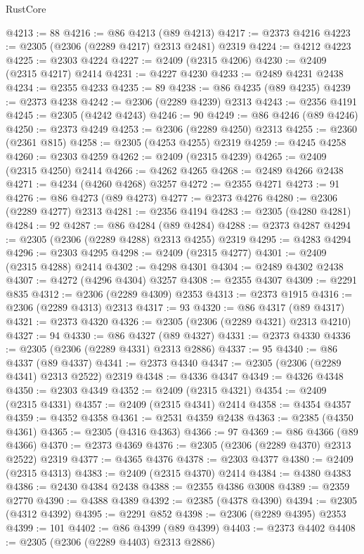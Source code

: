 \begin{lexlean}{RustCore}
\begin{coremodule}
@4213 := 88
@4216 := @86 @4213 (@89 @4213)
@4217 := @2373 @4216
@4223 := @2305 (@2306 (@2289 @4217) @2313 @2481) @2319
@4224 := @4212 @4223
@4225 := @2303 @4224
@4227 := @2409 (@2315 @4206)
@4230 := @2409 (@2315 @4217) @2414
@4231 := @4227 @4230
@4233 := @2489 @4231 @2438
@4234 := @2355 @4233
@4235 := 89
@4238 := @86 @4235 (@89 @4235)
@4239 := @2373 @4238
@4242 := @2306 (@2289 @4239) @2313
@4243 := @2356 @4191
@4245 := @2305 (@4242 @4243)
@4246 := 90
@4249 := @86 @4246 (@89 @4246)
@4250 := @2373 @4249
@4253 := @2306 (@2289 @4250) @2313
@4255 := @2360 (@2361 @815)
@4258 := @2305 (@4253 @4255) @2319
@4259 := @4245 @4258
@4260 := @2303 @4259
@4262 := @2409 (@2315 @4239)
@4265 := @2409 (@2315 @4250) @2414
@4266 := @4262 @4265
@4268 := @2489 @4266 @2438
@4271 := @4234 (@4260 @4268) @3257
@4272 := @2355 @4271
@4273 := 91
@4276 := @86 @4273 (@89 @4273)
@4277 := @2373 @4276
@4280 := @2306 (@2289 @4277) @2313
@4281 := @2356 @4194
@4283 := @2305 (@4280 @4281)
@4284 := 92
@4287 := @86 @4284 (@89 @4284)
@4288 := @2373 @4287
@4294 := @2305 (@2306 (@2289 @4288) @2313 @4255) @2319
@4295 := @4283 @4294
@4296 := @2303 @4295
@4298 := @2409 (@2315 @4277)
@4301 := @2409 (@2315 @4288) @2414
@4302 := @4298 @4301
@4304 := @2489 @4302 @2438
@4307 := @4272 (@4296 @4304) @3257
@4308 := @2355 @4307
@4309 := @2291 @835
@4312 := @2306 (@2289 @4309) @2353
@4313 := @2373 @1915
@4316 := @2306 (@2289 @4313) @2313
@4317 := 93
@4320 := @86 @4317 (@89 @4317)
@4321 := @2373 @4320
@4326 := @2305 (@2306 (@2289 @4321) @2313 @4210)
@4327 := 94
@4330 := @86 @4327 (@89 @4327)
@4331 := @2373 @4330
@4336 := @2305 (@2306 (@2289 @4331) @2313 @2886)
@4337 := 95
@4340 := @86 @4337 (@89 @4337)
@4341 := @2373 @4340
@4347 := @2305 (@2306 (@2289 @4341) @2313 @2522) @2319
@4348 := @4336 @4347
@4349 := @4326 @4348
@4350 := @2303 @4349
@4352 := @2409 (@2315 @4321)
@4354 := @2409 (@2315 @4331)
@4357 := @2409 (@2315 @4341) @2414
@4358 := @4354 @4357
@4359 := @4352 @4358
@4361 := @2531 @4359 @2438
@4363 := @2385 (@4350 @4361)
@4365 := @2305 (@4316 @4363)
@4366 := 97
@4369 := @86 @4366 (@89 @4366)
@4370 := @2373 @4369
@4376 := @2305 (@2306 (@2289 @4370) @2313 @2522) @2319
@4377 := @4365 @4376
@4378 := @2303 @4377
@4380 := @2409 (@2315 @4313)
@4383 := @2409 (@2315 @4370) @2414
@4384 := @4380 @4383
@4386 := @2430 @4384 @2438
@4388 := @2355 @4386 @3008
@4389 := @2359 @2770
@4390 := @4388 @4389
@4392 := @2385 (@4378 @4390)
@4394 := @2305 (@4312 @4392)
@4395 := @2291 @852
@4398 := @2306 (@2289 @4395) @2353
@4399 := 101
@4402 := @86 @4399 (@89 @4399)
@4403 := @2373 @4402
@4408 := @2305 (@2306 (@2289 @4403) @2313 @2886)

\end{coremodule}
\end{lexlean}
